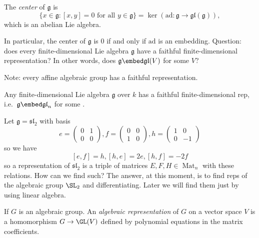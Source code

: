 \documentclass[a4paper]{article}
\DeclareMathOperator{\Mat}{Mat}
\newcommand*{\Lie}[1]{\mathfrak{#1}} %
\newcommand{\ad}{\mathrm{ad}} %
\begin{document}
\begin{definition}[center]
  The \emph{center} of \(\Lie g\) is
  \[
    \{x \in \Lie g: [x, y] = 0 \text{ for all } y \in \Lie g\} = \ker (\ad: \Lie g \to \Lie{gl}(\Lie g)),
  \]
  which is an abelian Lie algebra.
\end{definition}

In particular, the center of \(\Lie g\) is \(0\) if and only if \(\ad\) is an embedding. Question: does every finite-dimensional Lie algebra \(\Lie g\) have a faithful finite-dimensional representation? In other words, does \(\Lie g \embed \Lie{gl}(V)\) for some \(V\)?

Note: every affine algebraic group has a faithful representation.

\begin{theorem}[Ado]
  Any finite-dimensional Lie algebra \(\Lie g\) over \(k\) has a faithful finite-dimensional rep, i.e.\ \(\Lie g \embed \Lie{gl}_n\) for some \(.\)
\end{theorem}

\begin{eg}
  Let \(\Lie g = \Lie{sl}_2\) with basis
  \[
    e =
    \begin{pmatrix}
      0 & 1 \\
      0 & 0
    \end{pmatrix},
    f =
    \begin{pmatrix}
      0 & 0 \\
      1 & 0
    \end{pmatrix},
    h =
    \begin{pmatrix}
      1 & 0 \\
      0 & -1
    \end{pmatrix}
  \]
  so we have
  \[
    [e, f] = h,
    [h, e] = 2e,
    [h, f] = -2f
  \]
  so a representation of \(\Lie{sl}_2\) is a triple of matrices \(E, F, H \in \Mat_n\) with these relations. How can we find such? The answer, at this moment, is to find reps of the algebraic group \(\SL_2\) and differentiating. Later we will find them just by using linear algebra.
\end{eg}

\begin{definition}
  If \(G\) is an algebraic group. An \emph{algebraic representation} of \(G\) on a vector space \(V\) is a homomorphism \(G \to \GL(V)\) defined by polynomial equations in the matrix coefficients.
\end{definition}
\end{document}
